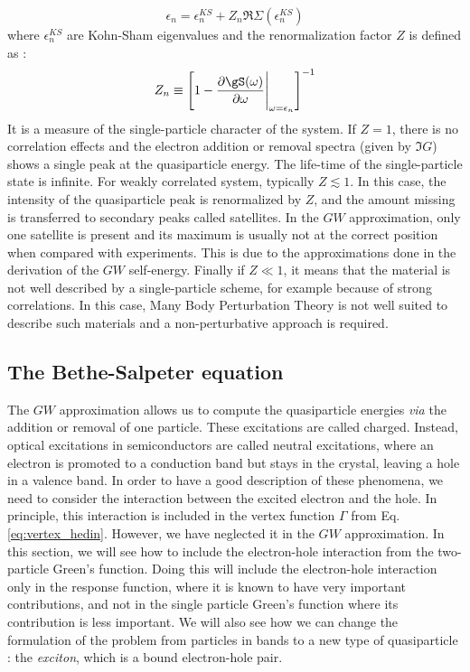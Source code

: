 \begin{equation}
	\epsilon_n = \epsilon^{KS}_n + Z_n\Re\Sigma(\epsilon^{KS}_n)
\end{equation} 
where $\epsilon^{KS}_n$ are Kohn-Sham eigenvalues and the renormalization factor $Z$ is defined as :
\begin{equation}
	Z_n \equiv \left[ 1 - \frac{\partial \gS(\omega)}{\partial \omega} \Biggr|_{\omega = \epsilon_n} \right]^{-1}
\end{equation}
It is a measure of the single-particle character of the system. If $Z=1$, there is no correlation effects and the electron addition or removal spectra (given by $\Im G$) shows a single peak at the quasiparticle energy. The life-time of the single-particle state is infinite. For weakly correlated system, typically $Z \lesssim 1$. In this case, the intensity of the quasiparticle peak is renormalized by $Z$, and the amount missing is transferred to secondary peaks called satellites. In the $GW$ approximation, only one satellite is present and its maximum is usually not at the correct position when compared with experiments. \cite{PhysRevLett.107.166401} This is due to the approximations done in the derivation of the $GW$ self-energy. Finally if $Z \ll 1$, it means that the material is not well described by a single-particle scheme, for example because of strong correlations. In this case, Many Body Perturbation Theory is not well suited to describe such materials and a non-perturbative approach is required.


\subsection{The Bethe-Salpeter equation}

The $GW$ approximation allows us to compute the quasiparticle energies \textit{via} the addition or removal of one particle. These excitations are called charged. Instead, optical excitations in semiconductors are called neutral excitations, where an electron is promoted to a conduction band but stays in the crystal, leaving a hole in a valence band. In order to have a good description of these phenomena, we need to consider the interaction between the excited electron and the hole. In principle, this interaction is included in the vertex function $\Gamma$ from Eq. \eqref{eq:vertex_hedin}. However, we have neglected it in the $GW$ approximation. In this section, we will see how to include the electron-hole interaction from the two-particle Green's function. Doing this will include the electron-hole interaction only in the response function, where it is known to have very important contributions, and not in the single particle Green's function where its contribution is less important. \cite{shishkin2007accurate} We will also see how we can change the formulation of the problem from particles in bands to a new type of quasiparticle : the \textit{exciton}, which is a bound electron-hole pair.


